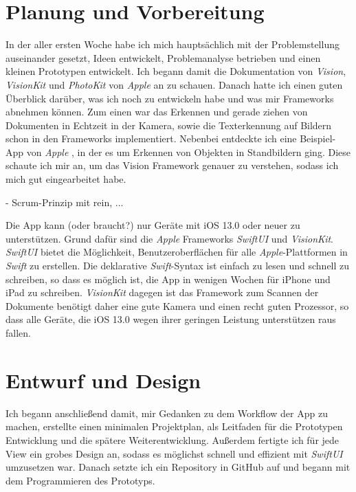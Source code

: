 \documentclass[nomenclature, 150]{HSMW-Thesis}
\begin{document}
	\section{Planung und Vorbereitung}
		In der aller ersten Woche habe ich mich hauptsächlich mit der Problemstellung auseinander gesetzt, Ideen entwickelt, Problemanalyse betrieben und einen kleinen Prototypen entwickelt. Ich begann damit die Dokumentation von \textit{Vision}, \textit{VisionKit} und \textit{PhotoKit} von \textit{Apple} an zu schauen. Danach hatte ich einen guten Überblick darüber, was ich noch zu entwickeln habe und was mir Frameworks abnehmen können. Zum einen war das Erkennen und gerade ziehen von Dokumenten in Echtzeit in der Kamera, sowie die Texterkennung auf Bildern schon in den Frameworks implementiert. Nebenbei entdeckte ich eine Beispiel-App von \textit{Apple} \cite{visionBasicApp}, in der es um Erkennen von Objekten in Standbildern ging. Diese schaute ich mir an, um das Vision Framework genauer zu verstehen, sodass ich mich gut eingearbeitet habe.
		
		- Scrum-Prinzip mit rein, ...
		
		Die App kann (oder braucht?) nur Geräte mit iOS 13.0 oder neuer zu unterstützen. Grund dafür sind die \textit{Apple} Frameworks \textit{SwiftUI} und \textit{VisionKit}. \textit{SwiftUI} bietet die Möglichkeit, Benutzeroberflächen für alle \textit{Apple}-Plattformen in \textit{Swift} zu erstellen. Die deklarative \textit{Swift}-Syntax ist einfach zu lesen und schnell zu schreiben, so dass es möglich ist, die App in wenigen Wochen für iPhone und iPad zu schreiben. \textit{VisionKit} dagegen ist das Framework zum Scannen der Dokumente benötigt daher eine gute Kamera und einen recht guten Prozessor, so dass alle Geräte, die iOS 13.0 wegen ihrer geringen Leistung unterstützen raus fallen.
	

	
	\section{Entwurf und Design}
		Ich begann anschließend damit, mir Gedanken zu dem Workflow der App zu machen, erstellte einen minimalen Projektplan, als Leitfaden für die Prototypen Entwicklung und die spätere Weiterentwicklung. Außerdem fertigte ich für jede View ein grobes Design an, sodass es möglichst schnell und effizient mit \textit{SwiftUI} umzusetzen war. Danach setzte ich ein Repository in GitHub auf und begann mit dem Programmieren des Prototyps. 
		
\end{document}
